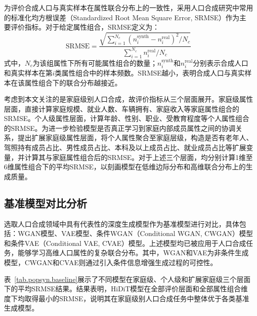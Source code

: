 为评价合成人口与真实样本在属性联合分布上的一致性，采用人口合成研究中常用的标准化均方根误差（Standardized Root Mean Square Error, SRMSE）作为主要评价指标\cite{mullerPopulationSynthesisMicrosimulation2010a,sunHierarchicalMixtureModeling2018,kukicOnestepGibbsSampling2024a,badu-marfoCompositeTravelGenerative2022}。对于给定属性组合，SRMSE定义为：
\begin{equation}
\text{SRMSE} =
\frac{
\sqrt{\sum_{i=1}^{N_c}\left(n_i^{\text{synth}} - n_i^{\text{real}}\right)^2 / N_c}
}{
\sum_{i=1}^{N_c} n_i^{\text{real}} / N_c
}
\label{eq.popsyn.srmse}
\end{equation}
式中，$N_c$为该组属性下所有可能属性组合的数量；$n_i^{\text{synth}}$和$n_i^{\text{real}}$分别表示合成人口和真实样本在第$i$类属性组合中的样本频数。SRMSE越小，表明合成人口与真实样本在该属性组合下的联合分布越接近。

考虑到本文关注的是家庭级别人口合成，故评价指标从三个层面展开。家庭级属性层面，直接计算家庭规模、就业人数、车辆拥有、家庭收入等家庭属性组合的SRMSE。个人级属性层面，计算年龄、性别、职业、受教育程度等个人属性组合的SRMSE。为进一步检验模型是否真正学习到家庭内部成员属性之间的协调关系，提出扩展家庭级属性层面，将个人属性聚合至家庭层级，构造是否有老年人、驾照持有成员占比、男性成员占比、本科及以上成员占比、就业成员占比等扩展变量，并计算其与家庭属性组合后的SRMSE。对于上述三个层面，均分别计算1维至6维属性组合下的平均SRMSE，以刻画模型在低维边际分布和高维联合分布上的生成质量。

\subsection{基准模型对比分析}\label{subsec.popsyn.experiment.baseline}

选取人口合成领域中具有代表性的深度生成模型作为基准模型进行对比，具体包括：WGAN模型\cite{kimDeepGenerativeModel2023}、VAE模型\cite{borysovHowGenerateMicroagents2019,kimDeepGenerativeModel2023}、条件WGAN（Conditional WGAN, CWGAN）模型\cite{kimImputingQualitativeAttributes2022}和条件VAE（Conditional VAE, CVAE）模型\cite{aemmerGenerativePopulationSynthesis2022}。上述模型均已被应用于人口合成任务，能够学习高维人口属性的复杂联合分布。其中，WGAN和VAE为非条件生成模型，CWGAN和CVAE则通过引入条件信息增强生成过程的可控性。

表~\ref{tab.popsyn.baseline}展示了不同模型在家庭级、个人级和扩展家庭级三个层面下的平均SRMSE结果。结果表明，HiDiT模型在全部评价层面和全部属性组合维度下均取得最小的SRMSE，说明其在家庭级别人口合成任务中整体优于各类基准生成模型。

